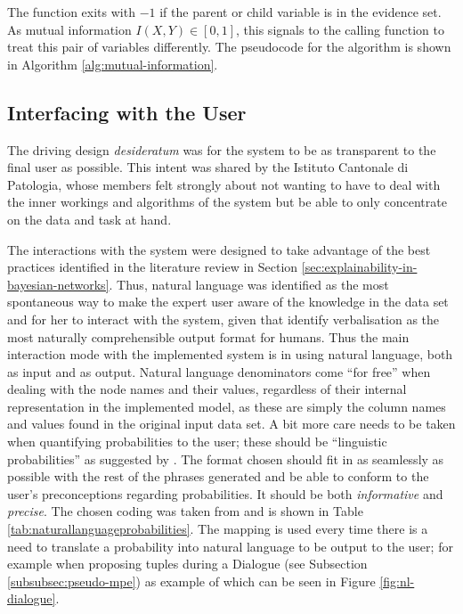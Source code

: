 The function exits with $-1$ if the parent or child variable is in the evidence set.
As mutual information $I(X,Y) \in [0,1]$, this signals to the calling function to treat this pair of variables differently.
The pseudocode for the algorithm is shown in Algorithm \ref{alg:mutual-information}.

\subsection{Interfacing with the User} \label{subsec:interfacing-user}
The driving design \textit{desideratum} was for the system to be as transparent to the final user as possible.
This intent was shared by the Istituto Cantonale di Patologia, whose members felt strongly about not wanting to have to deal with the inner workings and algorithms of the system but be able to only concentrate on the data and task at hand.

The interactions with the system were designed to take advantage of the best practices identified in the literature review in Section \ref{sec:explainability-in-bayesian-networks}.
Thus, natural language was identified as the most spontaneous way to make the expert user aware of the knowledge in the data set and for her to interact with the system, given that \citet{lacave2002review} identify verbalisation as the most naturally comprehensible output format for humans.
Thus the main interaction mode with the implemented system is in using natural language, both as input and as output.
Natural language denominators come \enquote{for free} when dealing with the node names and their values, regardless of their internal representation in the implemented model, as these are simply the column names and values found in the original input data set.
A bit more care needs to be taken when quantifying probabilities to the user; these should be \enquote{linguistic probabilities} as suggested by \citet{henrion1990qualtitative}.
The format chosen should fit in as seamlessly as possible with the rest of the phrases generated and be able to conform to the user's preconceptions regarding probabilities.
It should be both \textit{informative} and \textit{precise}.
The chosen coding was taken from \citet{Butz2018} and is shown in Table \ref{tab:naturallanguageprobabilities}.
The mapping is used every time there is a need to translate a probability into natural language to be output to the user; for example when proposing tuples during a Dialogue (see Subsection \ref{subsubsec:pseudo-mpe}) as example of which can be seen in Figure \ref{fig:nl-dialogue}.


